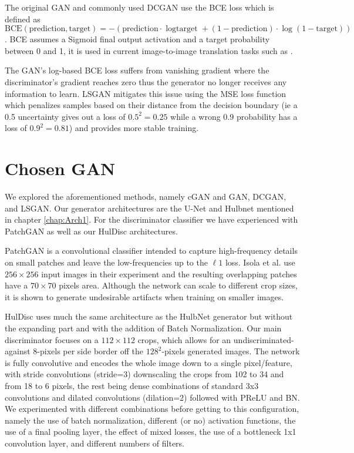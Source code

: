 The original \ac{GAN} and commonly used \ac{DCGAN} use the \ac{BCE} loss which is defined as $\text{BCE}(\text{prediction}, \text{target})=-(\text{prediction}\cdot{\log{\text{target}}}+(1-\text{prediction})\cdot \log{(1-\text{target})})$. \ac{BCE} assumes a Sigmoid final output activation and a target probability between 0 and 1, it is used in current image-to-image translation tasks such as \cite{pix2pix}\cite{cyclegan}.

The \ac{GAN}'s log-based \ac{BCE} loss suffers from vanishing gradient where the discriminator's gradient reaches zero thus the generator no longer receives any information to learn. \ac{LSGAN} mitigates this issue using the \acl{MSE} loss function which penalizes samples based on their distance from the decision boundary (ie a 0.5 uncertainty gives out a loss of $0.5^2=0.25$ while a wrong 0.9 probability has a loss of $0.9^2=0.81$) and provides more stable training. \cite{lsgan}

\section{Chosen GAN}

We explored the aforementioned methods, namely \ac{cGAN} and \ac{GAN}, \ac{DCGAN}, and \ac{LSGAN}. Our generator architectures are the U-Net \cite{unet} and Hulbnet mentioned in chapter \ref{chap:Arch1}. For the discriminator classifier we have experienced with PatchGAN \cite{pix2pix} as well as our HulDisc architectures.


PatchGAN is a convolutional classifier intended to capture high-frequency details on small patches and leave the low-frequencies up to the $\ell 1$ loss.  Isola et al. use $256\times 256$ input images in their experiment and the resulting overlapping patches have a $70 \times 70$ pixels area. Although the network can scale to different crop sizes, it is shown to generate undesirable artifacts when training on smaller images.

HulDisc uses much the same architecture as the HulbNet generator but without the expanding part and with the addition of Batch Normalization. Our main discriminator focuses on a $112\times 112$ crops, which allows for an undiscriminated-against 8-pixels per side border off the $128^2$-pixels generated images. The network is fully convolutive and encodes the whole image down to a single pixel/feature, with stride convolutions (stride=3) downscaling the crops from 102 to 34 and from 18 to 6 pixels, the rest being dense combinations of standard 3x3 convolutions and dilated convolutions (dilation=2) followed with \ac{PReLU} and \acl{BN}. We experimented with different combinations before getting to this configuration, namely the use of batch normalization, different (or no) activation functions, the use of a final pooling layer, the effect of mixed losses, the use of a bottleneck 1x1 convolution layer, and different numbers of filters.

